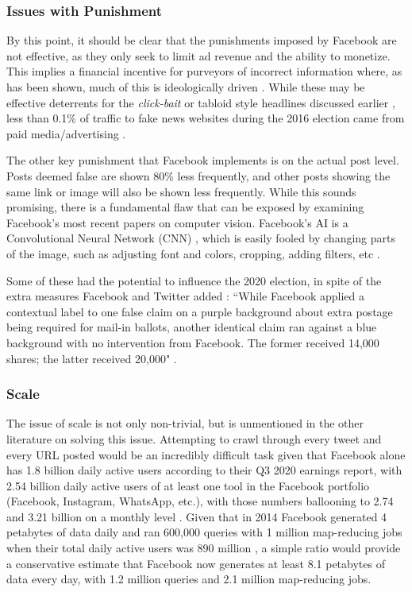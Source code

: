 \documentclass[preprint,review,12pt]{elsarticle}
\begin{document}
\subsubsection{Issues with Punishment}
\label{Issues with Punishment Section}
By this point, it should be clear that the punishments imposed by Facebook are not effective, as they only seek to limit ad revenue and the ability to monetize. This implies a financial incentive for purveyors of incorrect information where, as has been shown, much of this is ideologically driven \cite{allcott2017social}. While these may be effective deterrents for the \textit{click-bait} or tabloid style headlines discussed earlier  \cite{chen2015misleading}, less than 0.1\% of traffic to fake news websites during the 2016 election came from paid media/advertising \cite{albright2016election2016}. 

The other key punishment that Facebook implements is on the actual post level. Posts deemed false are shown 80\% less frequently, and other posts showing the same link or image will also be shown less frequently. While this sounds promising, there is a fundamental flaw that can be exposed by examining Facebook's most recent papers on computer vision. Facebook's AI is a Convolutional Neural Network (CNN) \cite{carion2020end}, which is easily fooled by changing parts of the image, such as adjusting font and colors, cropping, adding filters, etc \cite{sumbaly2020using}.

Some of these had the potential to influence the 2020 election, in spite of the extra measures Facebook and Twitter added \cite{dean2020facebook}: ``While Facebook applied a contextual label to one false claim on a purple background about extra postage being required for mail-in ballots, another identical claim ran against a blue background with no intervention from Facebook. The former received 14,000 shares; the latter received 20,000" \cite{Fung2020facebook}.

\subsubsection{Scale}
\label{Scale Section}
The issue of scale is not only non-trivial, but is unmentioned in the other literature on solving this issue. Attempting to crawl through every tweet and every URL posted would be an incredibly difficult task given that Facebook alone has 1.8 billion daily active users according to their Q3 2020 earnings report, with 2.54 billion daily active users of at least one tool in the Facebook portfolio (Facebook, Instagram, WhatsApp, etc.), with those numbers ballooning to 2.74 and 3.21 billion on a monthly level \cite{facebook2020q3}. Given that in 2014 Facebook generated 4 petabytes of data daily and ran 600,000 queries with 1 million map-reducing jobs when their total daily active users was 890 million \cite{bronson2015open}, a simple ratio would provide a conservative estimate that Facebook now generates at least 8.1 petabytes of data every day, with 1.2 million queries and 2.1 million map-reducing jobs. 
\end{document}
